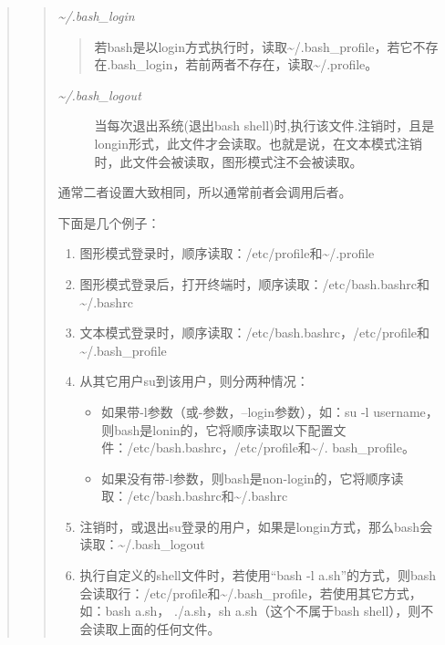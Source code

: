 \documentclass[letterpaper,10pt,english]{sphinxmanual}
\begin{document}
\begin{quote}
\begin{quote}
\emph{\textasciitilde{}/.bash\_login}
\begin{quote}

若bash是以login方式执行时，读取\textasciitilde{}/.bash\_profile，若它不存在.bash\_login，若前两者不存在，读取\textasciitilde{}/.profile。
\end{quote}
\begin{description}
\item[{\emph{\textasciitilde{}/.bash\_logout}}] \leavevmode
当每次退出系统(退出bash shell)时,执行该文件.注销时，且是longin形式，此文件才会读取。也就是说，在文本模式注销时，此文件会被读取，图形模式注不会被读取。

\end{description}

通常二者设置大致相同，所以通常前者会调用后者。

下面是几个例子：
\begin{enumerate}
\item {} 
图形模式登录时，顺序读取：/etc/profile和\textasciitilde{}/.profile

\item {} 
图形模式登录后，打开终端时，顺序读取：/etc/bash.bashrc和\textasciitilde{}/.bashrc

\item {} 
文本模式登录时，顺序读取：/etc/bash.bashrc，/etc/profile和\textasciitilde{}/.bash\_profile

\item {} 
从其它用户su到该用户，则分两种情况：
\begin{itemize}
\item {} 
如果带-l参数（或-参数，--login参数），如：su -l username，则bash是lonin的，它将顺序读取以下配置文件：/etc/bash.bashrc，/etc/profile和\textasciitilde{}/.   bash\_profile。

\item {} 
如果没有带-l参数，则bash是non-login的，它将顺序读取：/etc/bash.bashrc和\textasciitilde{}/.bashrc

\end{itemize}

\item {} 
注销时，或退出su登录的用户，如果是longin方式，那么bash会读取：\textasciitilde{}/.bash\_logout

\item {} 
执行自定义的shell文件时，若使用“bash -l a.sh”的方式，则bash会读取行：/etc/profile和\textasciitilde{}/.bash\_profile，若使用其它方式，如：bash a.sh， ./a.sh，sh a.sh（这个不属于bash shell），则不会读取上面的任何文件。


\end{enumerate}
\end{quote}
\end{quote}
\end{document}
